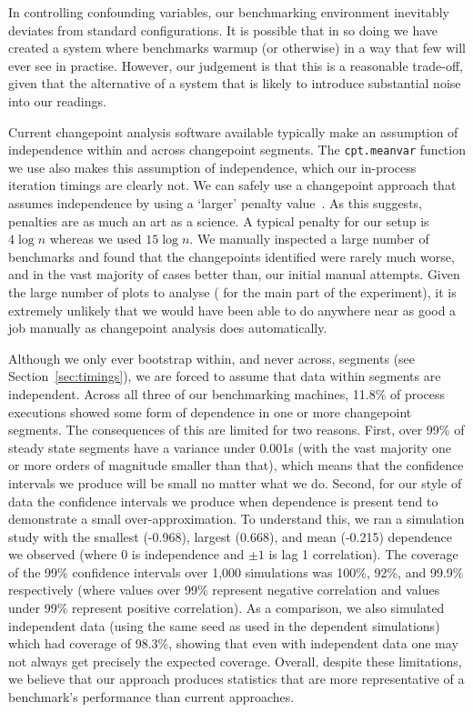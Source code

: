 \documentclass[acmsmall,screen]{acmart}
\begin{document}
In controlling confounding variables, our benchmarking environment inevitably
deviates from standard configurations. It is possible that in so doing we have
created a system where benchmarks warmup (or otherwise) in a way that few will ever see in
practise. However, our judgement is that this is a reasonable trade-off,
given that the alternative of a
system that is likely to introduce substantial noise into our readings.

Current changepoint analysis software available typically make an assumption of independence
within and across changepoint segments.  The \texttt{cpt.meanvar} function we use also makes this
assumption of independence, which our in-process iteration timings are clearly not.
We can safely use a changepoint approach that assumes independence by using a `larger'
penalty value~\cite{antoch97effect}. As this suggests, penalties are as much an
art as a science. A typical penalty for our setup is $4 \log n$ whereas we used $15 \log n$.
We manually inspected a large number of benchmarks and found that the
changepoints identified were rarely much worse, and in the vast majority of
cases better than, our initial manual attempts. Given the large number of
plots to analyse (\totalpexecs{} for the main part of the experiment), it is extremely unlikely that
we would have been able to do anywhere near as good a job manually as
changepoint analysis does automatically.

Although we only ever bootstrap within, and never across, segments (see
Section~\ref{sec:timings}), we are forced to assume that data within segments
are independent. Across all
three of our benchmarking machines, 11.8\% of process executions
showed some form of dependence in one or more changepoint segments.
The consequences of this are limited for two
reasons. First, over 99\% of steady state segments have a variance under 0.001s
(with the vast majority one or more orders of magnitude smaller than that),
which means that the confidence intervals we produce will be small no matter
what we do. Second, for our style of data the confidence intervals we
produce when dependence is present tend to demonstrate a small over-approximation.
To understand this, we ran a simulation study with the smallest (-0.968),
largest (0.668), and mean (-0.215) dependence we observed (where $0$ is
independence and $\pm 1$ is lag 1 correlation). The coverage
of the 99\% confidence intervals over 1,000 simulations was
100\%, 92\%, and 99.9\% respectively (where values over 99\% represent
negative correlation and values under 99\% represent positive correlation).
As a comparison, we also simulated independent data (using the
same seed as used in the dependent simulations) which had coverage of 98.3\%, showing
that even with independent data one may not always get precisely the expected coverage.
Overall, despite these limitations, we believe that our
approach produces statistics that are more representative of
a benchmark's performance than current approaches.
\end{document}
